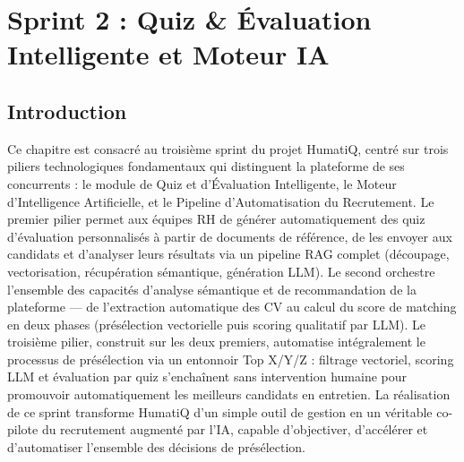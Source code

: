 %
\newpage
\pagestyle{fancy}
\renewcommand{\headrulewidth}{0.5pt}
\renewcommand{\footrulewidth}{0.5pt}
\chapter{Sprint 2 : Quiz \& Évaluation Intelligente et Moteur IA}
\setlength{\headheight}{27.2pt}
\label{ch5}
\minitoc
\newpage

\section*{Introduction}

Ce chapitre est consacré au troisième sprint du projet HumatiQ, centré sur trois piliers technologiques fondamentaux qui distinguent la plateforme de ses concurrents : le module de Quiz et d'Évaluation Intelligente, le Moteur d'Intelligence Artificielle, et le Pipeline d'Automatisation du Recrutement. Le premier pilier permet aux équipes RH de générer automatiquement des quiz d'évaluation personnalisés à partir de documents de référence, de les envoyer aux candidats et d'analyser leurs résultats via un pipeline RAG complet (découpage, vectorisation, récupération sémantique, génération LLM). Le second orchestre l'ensemble des capacités d'analyse sémantique et de recommandation de la plateforme — de l'extraction automatique des CV au calcul du score de matching en deux phases (présélection vectorielle puis scoring qualitatif par LLM). Le troisième pilier, construit sur les deux premiers, automatise intégralement le processus de présélection via un entonnoir Top X/Y/Z : filtrage vectoriel, scoring LLM et évaluation par quiz s'enchaînent sans intervention humaine pour promouvoir automatiquement les meilleurs candidats en entretien. La réalisation de ce sprint transforme HumatiQ d'un simple outil de gestion en un véritable co-pilote du recrutement augmenté par l'IA, capable d'objectiver, d'accélérer et d'automatiser l'ensemble des décisions de présélection.

